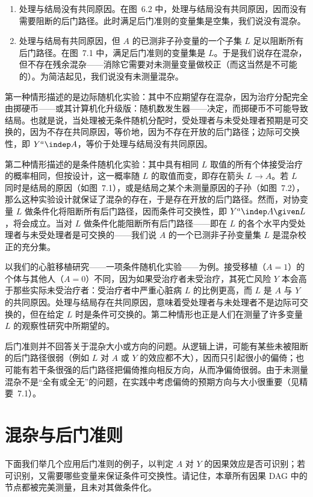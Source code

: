 \begin{enumerate}
\item 处理与结局没有共同原因。在图~6.2 中，处理与结局没有共同原因，因而没有需要阻断的后门路径。此时满足后门准则的变量集是空集，我们说没有混杂。
\item 处理与结局有共同原因，但 $A$ 的已测非子孙变量的一个子集 $L$ 足以阻断所有后门路径。在图~7.1 中，满足后门准则的变量集是 $L$。于是我们说存在混杂，但不存在残余混杂——消除它需要对未测量变量做校正（而这当然是不可能的）。为简洁起见，我们说没有未测量混杂。
\end{enumerate}

第一种情形描述的是边际随机化实验：其中不应期望存在混杂，因为治疗分配完全由掷硬币——或其计算机化升级版：随机数发生器——决定，而掷硬币不可能导致结局。也就是说，当处理被无条件随机分配时，受处理者与未受处理者预期是可交换的，因为不存在共同原因，等价地，因为不存在开放的后门路径；边际可交换性，即 $Y^{a}\indep A$，等价于处理与结局没有共同原因。

第二种情形描述的是条件随机化实验：其中具有相同 $L$ 取值的所有个体接受治疗的概率相同，但按设计，这一概率随 $L$ 的取值而变，即存在箭头 $L\to A$。若 $L$ 同时是结局的原因（如图~7.1），或是结局之某个未测量原因的子孙（如图~7.2），那么这种实验设计就保证了混杂的存在，于是存在开放的后门路径。然而，对协变量 $L$ 做条件化将阻断所有后门路径，因而条件可交换性，即 $Y^{a}\indep A\given L$，将会成立。当对 $L$ 做条件化能阻断所有后门路径——即在 $L$ 的各个水平内受处理者与未受处理者是可交换的——我们说 $A$ 的一个已测非子孙变量集 $L$ 是混杂校正的充分集。

以我们的心脏移植研究——一项条件随机化实验——为例。接受移植（$A=1$）的个体与其他人（$A=0$）不同，因为如果受治疗者未受治疗，其死亡风险 $Y$ 本会高于那些实际未受治疗者：受治疗者中严重心脏病 $L$ 的比例更高，而 $L$ 是 $A$ 与 $Y$ 的共同原因。处理与结局存在共同原因，意味着受处理者与未处理者不是边际可交换的，但在给定 $L$ 时是条件可交换的。第二种情形也正是人们在测量了许多变量 $L$ 的观察性研究中所期望的。

后门准则并不回答关于混杂大小或方向的问题。从逻辑上讲，可能有某些未被阻断的后门路径很弱（例如 $L$ 对 $A$ 或 $Y$ 的效应都不大），因而只引起很小的偏倚；也可能有若干条很强的后门路径把偏倚推向相反方向，从而净偏倚很弱。由于未测量混杂不是“全有或全无”的问题，在实践中考虑偏倚的预期方向与大小很重要（见精要~7.1）。

\section{混杂与后门准则}

下面我们举几个应用后门准则的例子，以判定 $A$ 对 $Y$ 的因果效应是否可识别；若可识别，又需要哪些变量来保证条件可交换性。请记住，本章所有因果 DAG 中的节点都被完美测量，且未对其做条件化。

